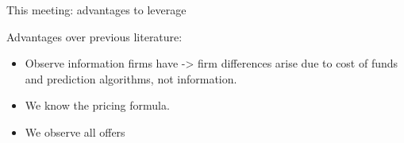 \documentclass[10pt,aspectratio=169]{beamer}
\begin{document}
\begin{frame}{This meeting: advantages to leverage}

Advantages over previous literature: 
\begin{itemize}
    \item Observe information firms have -> firm differences arise due to cost of funds and prediction algorithms, not information. 
    \item We know the pricing formula. 
    \item We observe all offers
     
\end{itemize}
\end{frame}
\end{document}
